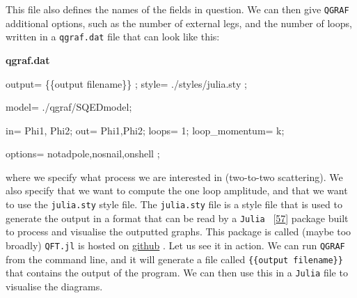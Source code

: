 \documentclass[
  11pt,
  a4paper,
  DIV=11,
  numbers=noendperiod,
  twoside]{scrreprt}
\newenvironment{Shaded}{\begin{snugshade}}{\end{snugshade}}
\newcommand{\NormalTok}[1]{\textcolor[rgb]{0.00,0.23,0.31}{#1}}
\DeclareRobustCommand{\[}{\begin{equation}}
\DeclareRobustCommand{\]}{\end{equation}}
\begin{document}
This file also defines the names of the fields in question. We can then
give \texttt{QGRAF} additional options, such as the number of external
legs, and the number of loops, written in a \texttt{qgraf.dat} file that
can look like this:

\textbf{qgraf.dat}

\begin{Shaded}
\begin{Highlighting}[]
\NormalTok{output= \textquotesingle{}\{\{output filename\}\}\textquotesingle{} ;}
\NormalTok{style= \textquotesingle{}./styles/julia.sty\textquotesingle{} ; }

\NormalTok{model= \textquotesingle{}./qgraf/SQEDmodel\textquotesingle{};}

\NormalTok{in= Phi1,  Phi2;}
\NormalTok{out= Phi1,Phi2;}
\NormalTok{loops= 1;}
\NormalTok{loop\_momentum= k;}

\NormalTok{options=  notadpole,nosnail,onshell ;}
\end{Highlighting}
\end{Shaded}

where we specify what process we are interested in (two-to-two
scattering). We also specify that we want to compute the one loop
amplitude, and that we want to use the \texttt{julia.sty} style file.
The \texttt{julia.sty} file is a style file that is used to generate the
output in a format that can be read by a \texttt{Julia}
~{[}\protect\hyperlink{ref-Bezanson:2015}{57}{]} package built to
process and visualise the outputted graphs. This package is called
(maybe too broadly) \texttt{QFT.jl} is hosted on
\href{https://github.com/lcnhb/QFT.jl}{github} . Let us see it in
action. We can run \texttt{QGRAF} from the command line, and it will
generate a file called \texttt{\{\{output\ filename\}\}} that contains
the output of the program. We can then use this in a \texttt{Julia} file
to visualise the diagrams.
\end{document}
